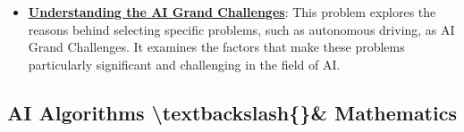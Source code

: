 \documentclass{article}%
\begin{document}
\begin{itemize}[leftmargin=*]
\item \href{https://purdue.brightspace.com/d2l/common/assets/pdfjs-d2l-dist/1.0.14-legacy/web/viewer.html?file=\%2Fcontent\%2Fenforced\%2F1095467-wl.202510.CS.24300.001\%2F02L2-Intro.pdf\%3Fou\%3D1095467\&lang=en-us\&container=d2l-fileviewer-rendered-pdf\&fullscreen=d2l-fileviewer-rendered-pdf-dialog\&height=667#page=43}{\textbf{Understanding the AI Grand Challenges}}: This problem explores the reasons behind selecting specific problems, such as autonomous driving, as AI Grand Challenges. It examines the factors that make these problems particularly significant and challenging in the field of AI.%
\end{itemize}

%
\subsection{AI Algorithms \textbackslash{}textbackslash\{\}\& Mathematics}%
\label{subsec:AIAlgorithmstextbackslashMathematics}%
\end{document}
